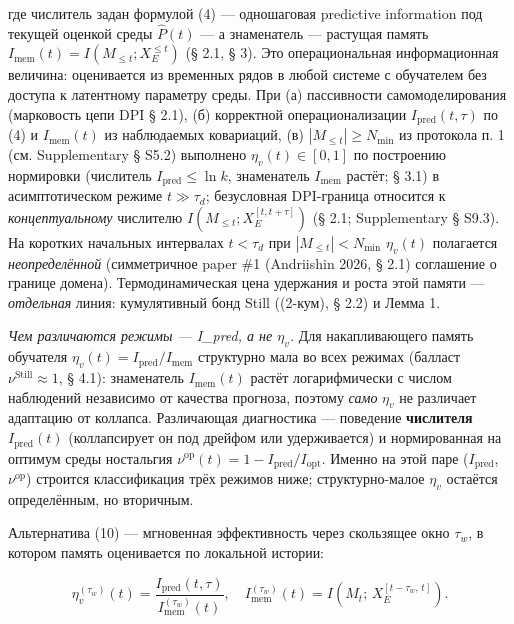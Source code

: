 \documentclass[pdflatex,sn-mathphys-ay]{sn-jnl}
\begin{document}
где числитель задан формулой (4) --- одношаговая predictive information под текущей оценкой среды \(\hat P(t)\) --- а знаменатель --- растущая память \(I_{\text{mem}}(t) = I(M_{\le t}; X_E^{\le t})\) (§ 2.1, § 3). Это операциональная информационная величина: оценивается из временных рядов в любой системе с обучателем без доступа к латентному параметру среды. При (а) пассивности самомоделирования (марковость цепи DPI § 2.1), (б) корректной операционализации \(I_{\text{pred}}(t,\tau)\) по (4) и \(I_{\text{mem}}(t)\) из наблюдаемых ковариаций, (в) \(|M_{\le t}| \ge N_{\min}\) из протокола п. 1 (см. Supplementary § S5.2) выполнено \(\eta_v(t) \in [0, 1]\) по построению нормировки (числитель \(I_{\text{pred}} \le \ln k\), знаменатель \(I_{\text{mem}}\) растёт; § 3.1) в асимптотическом режиме \(t \gg \tau_d\); безусловная DPI-граница относится к \emph{концептуальному} числителю \(I(M_{\le t}; X_E^{[t,t+\tau]})\) (§ 2.1; Supplementary § S9.3). На коротких начальных интервалах \(t < \tau_d\) при \(|M_{\le t}| < N_{\min}\) \(\eta_v(t)\) полагается \emph{неопределённой} (симметричное paper \#1 (Andriishin 2026, § 2.1) соглашение о границе домена). Термодинамическая цена удержания и роста этой памяти --- \emph{отдельная} линия: кумулятивный бонд Still ((2-кум), § 2.2) и Лемма 1.



\emph{Чем различаются режимы --- I\_pred, а не \(\eta_v\).} Для накапливающего память обучателя \(\eta_v(t) = I_{\text{pred}}/ I_{\text{mem}}\) структурно мала во всех режимах (балласт \(\nu^{\text{Still}} \approx 1\), § 4.1): знаменатель \(I_{\text{mem}}(t)\) растёт логарифмически с числом наблюдений независимо от качества прогноза, поэтому \emph{само} \(\eta_v\) не различает адаптацию от коллапса. Различающая диагностика --- поведение \textbf{числителя} \(I_{\text{pred}}(t)\) (коллапсирует он под дрейфом или удерживается) и нормированная на оптимум среды ностальгия \(\nu^{\text{op}}(t) = 1 - I_{\text{pred}}/I_{\text{opt}}\). Именно на этой паре (\(I_{\text{pred}}\), \(\nu^{\text{op}}\)) строится классификация трёх режимов ниже; структурно-малое \(\eta_v\) остаётся определённым, но вторичным.



Альтернатива (10) --- мгновенная эффективность через скользящее окно \(\tau_w\), в котором память оценивается по локальной истории:



\begin{equation}\eta_v^{(\tau_w)}(t) = \frac{I_{\text{pred}}(t, \tau)}{I_{\text{mem}}^{(\tau_w)}(t)}, \quad I_{\text{mem}}^{(\tau_w)}(t) = I\!\left(M_t;\, X_E^{[t-\tau_w,\,t]}\right). \tag{10a}\end{equation}
\end{document}
